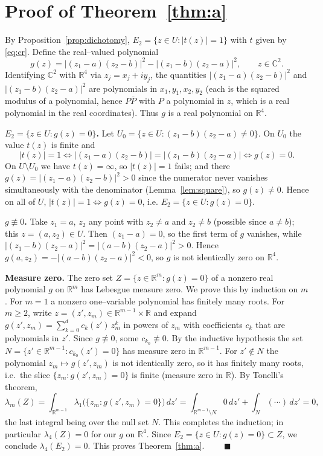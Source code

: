 \documentclass{amsart}
\theoremstyle{definition}
\theoremstyle{remark}
\newcommand{\C}{\mathbb{C}}
\newcommand{\R}{\mathbb{R}}
\begin{document}
\section{Proof of Theorem~\ref{thm:a}}

By Proposition~\ref{prop:dichotomy}, $E_2=\{z\in U:|t(z)|=1\}$ with $t$ given by
\eqref{eq:cr}. Define the real--valued polynomial
\[
g(z)=\bigl|(z_1-a)(z_2-b)\bigr|^2-\bigl|(z_1-b)(z_2-a)\bigr|^2,\qquad z\in\C^2 .
\]
Identifying $\C^2$ with $\R^4$ via $z_j=x_j+iy_j$, the quantities $|(z_1-a)(z_2-b)|^2$ and
$|(z_1-b)(z_2-a)|^2$ are polynomials in $x_1,y_1,x_2,y_2$ (each is the squared modulus of a
polynomial, hence $P\bar P$ with $P$ a polynomial in $z$, which is a real polynomial in the
real coordinates). Thus $g$ is a real polynomial on $\R^4$.

\textbf{$E_2=\{z\in U:g(z)=0\}$.} Let $U_0=\{z\in U:(z_1-b)(z_2-a)\neq0\}$. On $U_0$ the
value $t(z)$ is finite and
\[
|t(z)|=1\iff \bigl|(z_1-a)(z_2-b)\bigr|=\bigl|(z_1-b)(z_2-a)\bigr|\iff g(z)=0 .
\]
On $U\setminus U_0$ we have $t(z)=\infty$, so $|t(z)|=1$ fails; and there
$g(z)=|(z_1-a)(z_2-b)|^2>0$ since the numerator never vanishes simultaneously with the
denominator (Lemma~\ref{lem:square}), so $g(z)\neq0$. Hence on all of $U$,
$|t(z)|=1\iff g(z)=0$, i.e. $E_2=\{z\in U:g(z)=0\}$.

\textbf{$g\not\equiv0$.} Take $z_1=a$, $z_2$ any point with $z_2\neq a$ and $z_2\neq b$
(possible since $a\neq b$); this $z=(a,z_2)\in U$. Then $(z_1-a)=0$, so the first term of
$g$ vanishes, while $|(z_1-b)(z_2-a)|^2=|(a-b)(z_2-a)|^2>0$. Hence
$g(a,z_2)=-|(a-b)(z_2-a)|^2<0$, so $g$ is not identically zero on $\R^4$.

\textbf{Measure zero.} The zero set $Z=\{z\in\R^m:g(z)=0\}$ of a nonzero real polynomial
$g$ on $\R^m$ has Lebesgue measure zero. We prove this by induction on $m$. For $m=1$ a
nonzero one--variable polynomial has finitely many roots. For $m\ge2$, write
$z=(z',z_m)\in\R^{m-1}\times\R$ and expand
$g(z',z_m)=\sum_{k=0}^{d}c_k(z')\,z_m^{k}$ in powers of $z_m$ with coefficients $c_k$ that
are polynomials in $z'$. Since $g\not\equiv0$, some $c_{k_0}\not\equiv0$. By the inductive
hypothesis the set $N=\{z'\in\R^{m-1}:c_{k_0}(z')=0\}$ has measure zero in $\R^{m-1}$. For
$z'\notin N$ the polynomial $z_m\mapsto g(z',z_m)$ is not identically zero, so it has finitely
many roots, i.e.\ the slice $\{z_m:g(z',z_m)=0\}$ is finite (measure zero in $\R$). By
Tonelli's theorem,
\[
\lambda_m(Z)=\int_{\R^{m-1}}\lambda_1\bigl(\{z_m:g(z',z_m)=0\}\bigr)\,dz'
=\int_{\R^{m-1}\setminus N}0\,dz'+\int_{N}(\cdots)\,dz'=0,
\]
the last integral being over the null set $N$. This completes the induction; in particular
$\lambda_4(Z)=0$ for our $g$ on $\R^4$. Since $E_2=\{z\in U:g(z)=0\}\subset Z$, we conclude
$\lambda_4(E_2)=0$. This proves Theorem~\ref{thm:a}. $\qquad\blacksquare$
\end{document}
